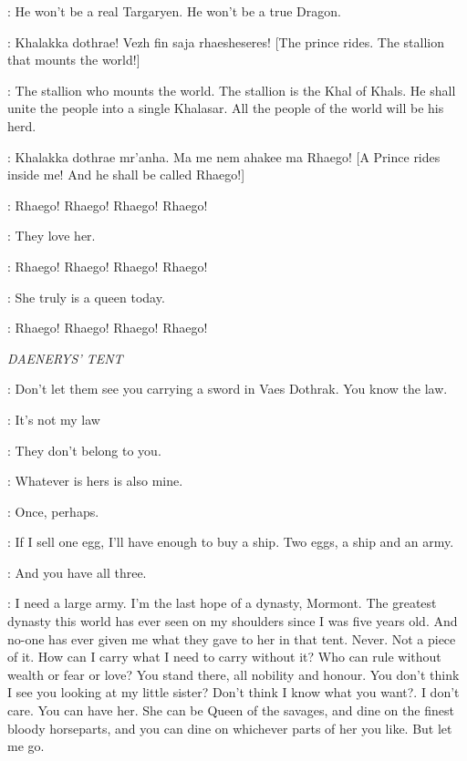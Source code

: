 \VISERYS: He won't be a real Targaryen. He won't be a true Dragon. 


\PRIESTESS: Khalakka dothrae! Vezh fin saja rhaesheseres! [The prince rides. The stallion that mounts the world!] 

\JORAH: The stallion who mounts the world. The stallion is the Khal of Khals. He shall unite the people into a single Khalasar. All the people of the world will be his herd. 

\DAENERYS: Khalakka dothrae mr'anha. Ma me nem ahakee ma Rhaego! [A Prince rides inside me! And he shall be called Rhaego!] 

\CROWD: Rhaego! Rhaego! Rhaego! Rhaego! 

\VISERYS: They love her. 


\CROWD: Rhaego! Rhaego! Rhaego! Rhaego! 

\JORAH: She truly is a queen today.  

\CROWD: Rhaego! Rhaego! Rhaego! Rhaego! 


\scene

\textit{DAENERYS' TENT} 


\JORAH: Don't let them see you carrying a sword in Vaes Dothrak. You know the law. 

\VISERYS: It's not my law 

\JORAH: They don't belong to you. 

\VISERYS: Whatever is hers is also mine. 

\JORAH: Once, perhaps. 

\VISERYS: If I sell one egg, I'll have enough to buy a ship. Two eggs, a ship and an army. 

\JORAH: And you have all three. 

\VISERYS: I need a large army. I'm the last hope of a dynasty, Mormont. The greatest dynasty this world has ever seen on my shoulders since I was five years old. And no-one has ever given me what they gave to her in that tent. Never. Not a piece of it. How can I carry what I need to carry without it? Who can rule without wealth or fear or love? You stand there, all nobility and honour. You don't think I see you looking at my little sister? Don't think I know what you want?. I don't care. You can have her. She can be Queen of the savages, and dine on the finest bloody horseparts, and you can dine on whichever parts of her you like. But let me go. 

